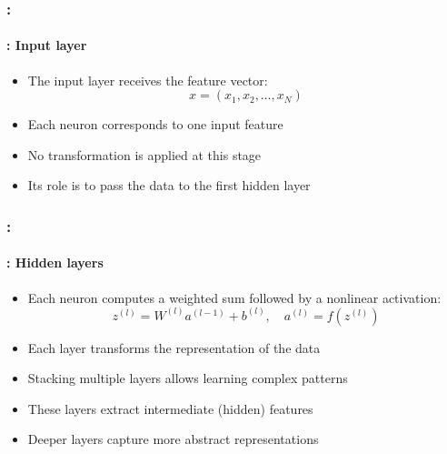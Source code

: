 \documentclass[xcolor=table]{beamer}
\begin{document}
\begin{frame}
	\frametitle{\insertshortsubtitle: \insertsection}
	\framesubtitle{\insertsubsection: Input layer}
	
	\begin{itemize}
		\item The input layer receives the feature vector:
		\[
		x = (x_1, x_2, \dots, x_N)
		\]
		
		\item Each neuron corresponds to one input feature
		
		\item No transformation is applied at this stage
		
		\item Its role is to pass the data to the first hidden layer
	\end{itemize}
	
\end{frame}


\begin{frame}
	\frametitle{\insertshortsubtitle: \insertsection}
	\framesubtitle{\insertsubsection: Hidden layers}
	
	\begin{itemize}
		\item Each neuron computes a weighted sum followed by a nonlinear activation:
		\[
		z^{(l)} = W^{(l)} a^{(l-1)} + b^{(l)}, 
		\quad a^{(l)} = f(z^{(l)})
		\]
		
		\item Each layer transforms the representation of the data
		
		\item Stacking multiple layers allows learning complex patterns
		
		\item These layers extract intermediate (hidden) features
		
		\item Deeper layers capture more abstract representations
	\end{itemize}
	
\end{frame}
\end{document}
